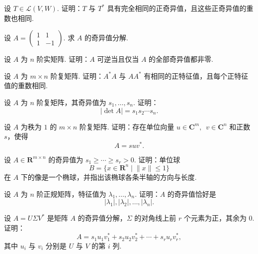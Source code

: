 \begin{exercise}

    \begin{exgroup}
        \item 设 $T \in \mathcal{L}(V, W)$. 证明：$T$ 与 $T^*$ 具有完全相同的正奇异值，且这些正奇异值的重数也相同.

        \item 设 $A = \begin{pmatrix}
            1 & 1 \\
            1 & -1
        \end{pmatrix}$. 求 $A$ 的奇异值分解.

        \item 设 $A$ 为 $n$ 阶实矩阵. 证明：$A$ 可逆当且仅当 $A$ 的全部奇异值都非零.
    \end{exgroup}

    \begin{exgroup}
        \item 设 $A$ 为 $m \times n$ 阶复矩阵. 证明：$A^*A$ 与 $AA^*$ 有相同的正特征值，且每个正特征值的重数相同.

        \item 设 $A$ 为 $n$ 阶复矩阵，其奇异值为 $s_1, \ldots, s_n$. 证明：
        \[
            |\det A| = s_1s_2\cdots s_n.
        \]

        \item 设 $A$ 为秩为 $1$ 的 $m \times n$ 阶复矩阵. 证明：存在单位向量 $u \in \mathbf{C}^m,\enspace v \in \mathbf{C}^n$ 和正数 $s$，使得
            \[
                A = suv^*.
            \]
    \end{exgroup}

    \begin{exgroup}
        \item 设 $A \in \mathbf{R}^{m \times n}$ 的奇异值为 $s_1 \geqslant \cdots \geqslant s_r > 0$. 证明：单位球
        \[
            B = \{x \in \mathbf{R}^n \mid \lVert x \rVert \leqslant 1\}
        \]
        在 $A$ 下的像是一个椭球，并指出该椭球各条半轴的方向与长度.

        \item 设 $A$ 为 $n$ 阶正规矩阵，特征值为 $\lambda_1, \ldots, \lambda_n$. 证明：$A$ 的奇异值恰好是
        \[
            |\lambda_1|, |\lambda_2|, \ldots, |\lambda_n|.
        \]

        \item 设 $A = U\Sigma V^*$ 是矩阵 $A$ 的奇异值分解，$\Sigma$ 的对角线上前 $r$ 个元素为正，其余为 $0$. 证明：
        \[
            A = s_1u_1v_1^* + s_2u_2v_2^* + \cdots + s_ru_rv_r^*,
        \]
        其中 $u_i$ 与 $v_i$ 分别是 $U$ 与 $V$ 的第 $i$ 列.
    \end{exgroup}
\end{exercise}
